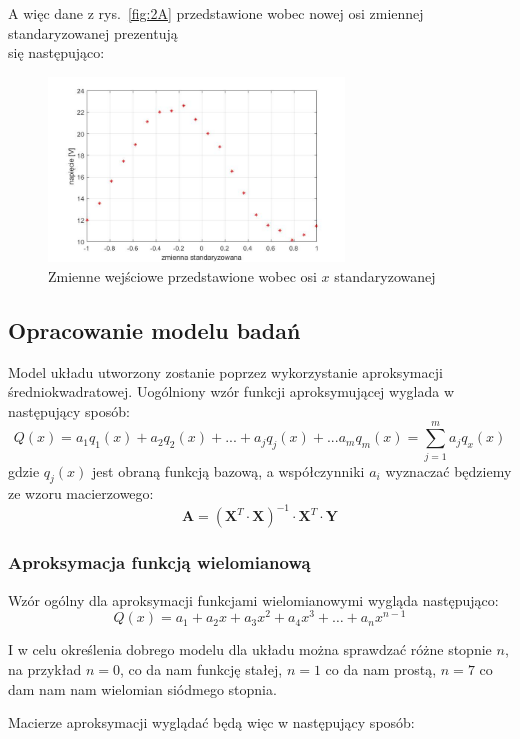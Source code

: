 \documentclass[a4paper, 12pt]{mwart}
\begin{document}
			\newpage
			A więc dane z rys.~\ref{fig:2A} przedstawione wobec nowej osi zmiennej standaryzowanej
			prezentują\\się następująco:
			\begin{figure}[h]
				\begin{center}
					\includegraphics[width = 0.7\textwidth]{graphs/2B.jpg}
					\caption{Zmienne wejściowe przedstawione wobec osi $x$ standaryzowanej}
					\label{fig:2B}
				\end{center}
			\end{figure}

		\subsection{Opracowanie modelu badań}
			Model układu utworzony zostanie poprzez wykorzystanie aproksymacji średniokwadratowej.
			Uogólniony wzór funkcji aproksymującej wyglada w następujący sposób:
			$$ Q(x) = a_1 q_1(x) + a_2 q_2(x) + ... + a_j q_j(x) + ... a_m q_m(x) = \sum_{j=1}^m a_j q_x(x)$$
			gdzie $q_j(x)$ jest obraną funkcją bazową, a współczynniki $a_i$ wyznaczać będziemy ze
			wzoru macierzowego:
			$$ \textbf{A} = \left( \textbf{X}^T \cdot \textbf{X} \right)^{-1} \cdot \textbf{X}^T \cdot \textbf{Y} $$

			\subsubsection{Aproksymacja funkcją wielomianową}
				Wzór ogólny dla aproksymacji funkcjami wielomianowymi wygląda następująco:
				$$ Q(x) = a_1 + a_2x + a_3 x^2 + a_4 x^3 + \dots + a_n x^{n-1} $$
				
				I w celu określenia dobrego modelu dla układu można sprawdzać różne stopnie $n$, 
				na przykład $n=0$, co da nam funkcję stałej, $n=1$ co da nam prostą, $n=7$ co dam nam
				nam wielomian siódmego stopnia.

				Macierze aproksymacji wyglądać będą więc w następujący sposób:
\end{document}
